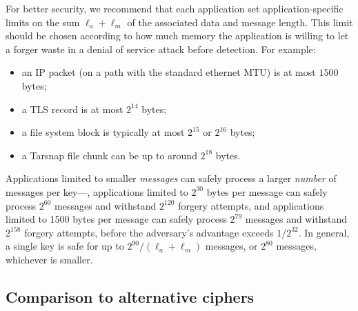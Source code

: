 \documentclass[draft]{article}
\DeclareRobustCommand{\operatorsc}[1]{{%
  \ifmmode\let\next=\operatorname\else\let\next=\relax\fi\next{\textsc{#1}}}}
\def\Daence/{\operatorsc{Daence}}
\begin{document}
For better security, we recommend that each application set
 application-specific limits on the sum $\ell_a + \ell_m$ of the
 associated data and message length.
This limit should be chosen according to how much memory the
 application is willing to let a forger waste in a denial of service
 attack before detection.
For example:
\begin{itemize}
  \item an IP packet (on a path with the standard ethernet MTU)
     is at most $1500$ bytes;
  \item a TLS record is at most $2^{14}$ bytes;
  \item a file system block is typically at most $2^{15}$ or $2^{16}$ bytes;
  \item a Tarsnap file chunk can be up to around $2^{18}$ bytes.
\end{itemize}
Applications limited to smaller \emph{messages} can safely process a
 larger \emph{number} of messages per key---\eg, applications limited
 to $2^{30}$ bytes per message can safely process $2^{60}$ messages and
 withstand $2^{120}$ forgery attempts, and applications limited to 1500
 bytes per message can safely process $2^{79}$ messages and withstand
 $2^{158}$ forgery attempts, before the adversary's advantage exceeds
 $1/2^{32}$.
In general, a single \Daence/ key is safe for up to
 $2^{90}\!/(\ell_a + \ell_m)$
 messages, or $2^{80}$ messages, whichever is smaller.

\subsection{Comparison to alternative ciphers}
\end{document}
